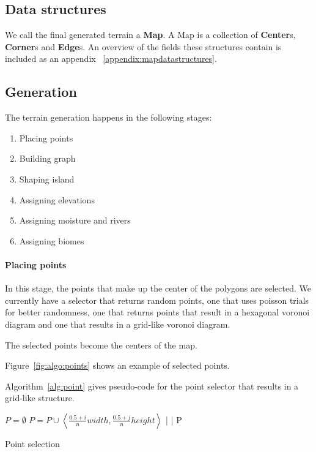 
\subsection{Data structures}

We call the final generated terrain a \textbf{Map}.
A Map is a collection of \textbf{Center}s, \textbf{Corner}s and \textbf{Edge}s.
An overview of the fields these structures contain is included as an appendix ~\ref{appendix:mapdatastructures}.

\subsection{Generation}

The terrain generation happens in the following stages:

\begin{enumerate}
	\item Placing points
	\item Building graph
	\item Shaping island
	\item Assigning elevations
	\item Assigning moisture and rivers
	\item Assigning biomes
\end{enumerate}

\paragraph{Placing points}

In this stage, the points that make up the center of the polygons are selected.
We currently have a selector that returns random points, one that uses poisson trials for better randomness, one that returns points that result in a hexagonal voronoi diagram and one that results in a grid-like voronoi diagram.

The selected points become the centers of the map.

Figure~\ref{fig:algo:points} shows an example of selected points.

Algorithm~\ref{alg:point} gives pseudo-code for the point selector that results in a grid-like structure.

\begin{algo*}
\begin{sourcecode}
$P = \emptyset$
		$P = P \cup \left<\frac{0.5 + i}{n} width, \frac{0.5 + j}{n} height\right>$
	|
|
\return P
\qend
\end{sourcecode}
	\caption{Point selection}
	\label{alg:point}
\end{algo*}

